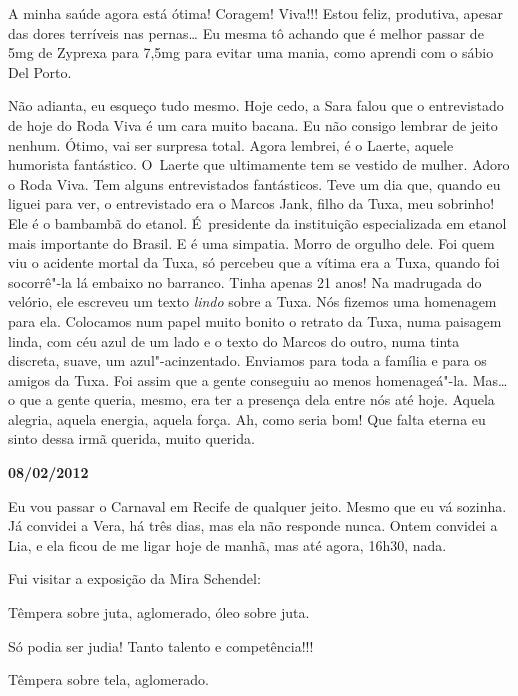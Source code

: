 A minha saúde agora está ótima! Coragem! Viva!!! Estou feliz, produtiva,
apesar das dores terríveis nas pernas… Eu mesma tô achando que é
melhor passar de 5mg de Zyprexa para 7,5mg para evitar uma mania, como
aprendi com o sábio Del Porto.

Não adianta, eu esqueço tudo mesmo. Hoje cedo, a Sara falou que o
entrevistado de hoje do Roda Viva é um cara muito bacana. Eu não consigo
lembrar de jeito nenhum. Ótimo, vai ser surpresa total. Agora lembrei, é
o Laerte, aquele humorista fantástico. O~Laerte que ultimamente tem se
vestido de mulher. Adoro o Roda Viva. Tem alguns entrevistados
fantásticos. Teve um dia que, quando eu liguei para ver, o entrevistado
era o Marcos Jank, filho da Tuxa, meu sobrinho! Ele é o bambambã do
etanol. É~presidente da instituição especializada em etanol mais
importante do Brasil. E é uma simpatia. Morro de orgulho dele. Foi quem
viu o acidente mortal da Tuxa, só percebeu que a vítima era a Tuxa,
quando foi socorrê"-la lá embaixo no barranco. Tinha apenas 21 anos! Na
madrugada do velório, ele escreveu um texto \emph{lindo} sobre a Tuxa.
Nós fizemos uma homenagem para ela. Colocamos num papel muito bonito o
retrato da Tuxa, numa paisagem linda, com céu azul de um lado e o texto
do Marcos do outro, numa tinta discreta, suave, um azul"-acinzentado.
Enviamos para toda a família e para os amigos da Tuxa. Foi assim que a
gente conseguiu ao menos homenageá"-la. Mas… o que a gente queria,
mesmo, era ter a presença dela entre nós até hoje. Aquela alegria,
aquela energia, aquela força. Ah, como seria bom! Que falta eterna eu
sinto dessa irmã querida, muito querida.

\begin{center}\asterisc{}\end{center}

\begin{flushright}\textbf{08/02/2012}\end{flushright}


Eu vou passar o Carnaval em Recife de qualquer jeito. Mesmo que eu vá
sozinha. Já convidei a Vera, há três dias, mas ela não responde nunca.
Ontem convidei a Lia, e ela ficou de me ligar hoje de manhã, mas até
agora, 16h30, nada.

Fui visitar a exposição da Mira Schendel:

Têmpera sobre juta, aglomerado, óleo sobre juta.

Só podia ser judia! Tanto talento e competência!!!

Têmpera sobre tela, aglomerado.

